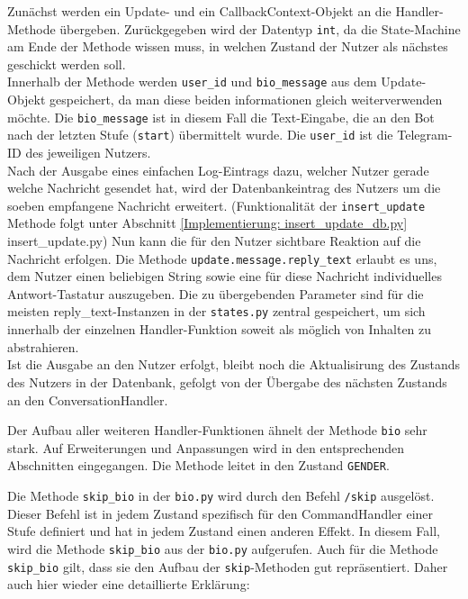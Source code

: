                 Zunächst werden ein Update- und ein CallbackContext-Objekt an die Handler-Methode übergeben. Zurückgegeben wird der Datentyp \verb|int|, da die State-Machine am Ende der Methode wissen muss, in welchen Zustand der Nutzer als nächstes geschickt werden soll. \\
                Innerhalb der Methode werden \verb|user_id| und \verb|bio_message| aus dem Update-Objekt gespeichert, da man diese beiden informationen gleich weiterverwenden möchte. Die \verb|bio_message| ist in diesem Fall die Text-Eingabe, die an den Bot nach der letzten Stufe (\verb|start|) übermittelt wurde. Die \verb|user_id| ist die Telegram-ID des jeweiligen Nutzers. \\
                Nach der Ausgabe eines einfachen Log-Eintrags dazu, welcher Nutzer gerade welche Nachricht gesendet hat, wird der Datenbankeintrag des Nutzers um die soeben empfangene Nachricht erweitert. (Funktionalität der \verb|insert_update| Methode folgt unter Abschnitt \ref{Implementierung: insert_update_db.py} insert\_update.py)
                Nun kann die für den Nutzer sichtbare Reaktion auf die Nachricht erfolgen. Die Methode \verb|update.message.reply_text| erlaubt es uns, dem Nutzer einen beliebigen String sowie eine für diese Nachricht individuelles Antwort-Tastatur auszugeben. Die zu übergebenden Parameter sind für die meisten reply\_text-Instanzen in der \verb|states.py| zentral gespeichert, um sich innerhalb der einzelnen Handler-Funktion soweit als möglich von Inhalten zu abstrahieren.\\
                Ist die Ausgabe an den Nutzer erfolgt, bleibt noch die Aktualisirung des Zustands des Nutzers in der Datenbank, gefolgt von der Übergabe des nächsten Zustands an den ConversationHandler.

                Der Aufbau aller weiteren Handler-Funktionen ähnelt der Methode \verb|bio| sehr stark. Auf Erweiterungen und Anpassungen wird in den entsprechenden Abschnitten eingegangen. Die Methode leitet in den Zustand \verb|GENDER|.

                Die Methode \verb|skip_bio| in der \verb|bio.py| wird durch den Befehl \verb|/skip| ausgelöst. Dieser Befehl ist in jedem Zustand spezifisch für den CommandHandler einer Stufe definiert und hat in jedem Zustand einen anderen Effekt. In diesem Fall, wird die Methode \verb|skip_bio| aus der \verb|bio.py| aufgerufen. Auch für die Methode \verb|skip_bio| gilt, dass sie den Aufbau der \verb|skip|-Methoden gut repräsentiert. Daher auch hier wieder eine detaillierte Erklärung:

